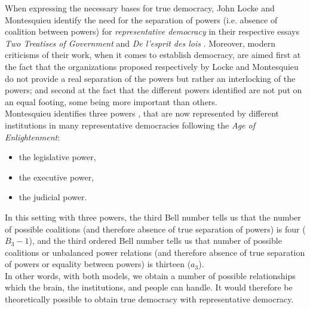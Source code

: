 When expressing the necessary bases for true democracy, John Locke and Montesquieu identify the need for the separation of powers (i.e. absence of coalition between powers) for \textit{representative democracy} in their respective essays \textit{Two Treatises of Government} \cite{Locke1689} and \textit{De l'esprit des lois} \cite{Montesquieu1748}. Moreover, modern criticisms of their work, when it comes to establish democracy, are aimed first at the fact that the organizations proposed respectively by Locke and Montesquieu do not provide a real separation of the powers but rather an interlocking of the powers; and second at the fact that the different powers identified are not put on an equal footing, some being more important than others.\\

Montesquieu identifies three powers \cite{Montesquieu1748}, that are now represented by different institutions in many representative democracies following the \textit{Age of Enlightenment}:
\begin{itemize}
\item the legislative power,
\item the executive power,
\item the judicial power.
\end{itemize}
In this setting with three powers, the third Bell number tells us that the number of possible coalitions (and therefore absence of true separation of powers) is four ($B_3 - 1$), and the third ordered Bell number tells us that number of possible coalitions or unbalanced power relations (and therefore absence of true separation of powers or equality between powers) is thirteen ($a_3$).\\
In other words, with both models, we obtain a number of possible relationships which the brain, the institutions, and people can handle.
It would therefore be theoretically possible to obtain true democracy with representative democracy.\\

